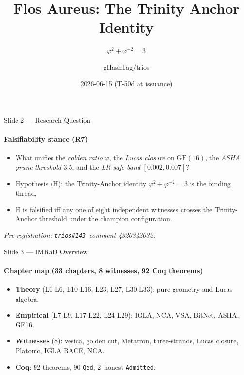 \documentclass[10pt,aspectratio=169]{beamer}
\title[Flos Aureus]{Flos Aureus: The Trinity Anchor Identity}
\subtitle{\(\varphi^{2}+\varphi^{-2}=3\)}
\author{gHashTag/trios}
\institute{Defense Package — LD Lane (auditor v1.0)}
\date{2026-06-15 (T-50d at issuance)}
\begin{document}

\begin{frame}
  \titlepage
\end{frame}

\begin{frame}{Slide 2 — Research Question}
  \framesubtitle{Falsifiability stance (R7)}
  \begin{itemize}
    \item What unifies the \emph{golden ratio} \(\varphi\), the
      \emph{Lucas closure} on \(\mathrm{GF}(16)\), the \emph{ASHA prune
      threshold} \(3.5\), and the \emph{LR safe band} \([0.002, 0.007]\)?
    \item Hypothesis (H): the Trinity-Anchor identity
      \(\varphi^{2}+\varphi^{-2}=3\) is the binding thread.
    \item H is falsified iff any one of eight independent witnesses
      crosses the Trinity-Anchor threshold under the champion
      configuration.
  \end{itemize}
  \vfill
  \footnotesize\emph{Pre-registration: \texttt{trios\#143}~comment 4320342032.}
\end{frame}

\begin{frame}{Slide 3 — IMRaD Overview}
  \framesubtitle{Chapter map (33 chapters, 8 witnesses, 92 Coq theorems)}
  \begin{itemize}
    \item \textbf{Theory} (L0-L6, L10-L16, L23, L27, L30-L33): pure
      geometry and Lucas algebra.
    \item \textbf{Empirical} (L7-L9, L17-L22, L24-L29): IGLA, NCA,
      VSA, BitNet, ASHA, GF16.
    \item \textbf{Witnesses} (8): vesica, golden cut, Metatron,
      three-strands, Lucas closure, Platonic, IGLA RACE, NCA.
    \item \textbf{Coq}: 92 theorems, 90 \texttt{Qed}, 2~honest
      \texttt{Admitted}.
  \end{itemize}
\end{frame}
\end{document}
